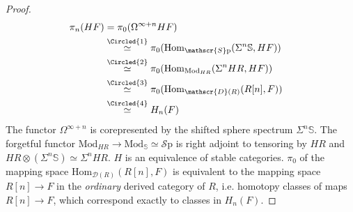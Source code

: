 \documentclass[10pt]{amsart}
\newcommand{\D}{\mathscr{D}}
\newcommand{\bS}{\mathbb{S}}
\newcommand{\Hom}{\mathrm{Hom}}
\newcommand{\Sp}{\mathscr{S}\mathrm{p}}
\newcommand{\Mod}{\mathrm{Mod}}
\theoremstyle{definition}
\theoremstyle{remark}
\numberwithin{equation}{section}
\begin{document}
\begin{proof}
  \begin{align*}
    \pi_n(HF) & =\pi_0(\Omega^{\infty+n}HF)\\
    & \overset{\Circled{1}}{\simeq} \pi_0(\Hom_{\Sp}(\Sigma^n\bS,HF)) \\
    & \overset{\Circled{2}}{\simeq} \pi_0(\Hom_{\Mod_{HR}}(\Sigma^n HR,HF)) & \\
    & \overset{\Circled{3}}{\simeq} \pi_0(\Hom_{\D(R)}(R[n],F))\\
    & \overset{\Circled{4}}{\simeq} H_n(F)
  \end{align*}  The functor $\Omega^{\infty+n}$ is corepresented by the shifted sphere spectrum $\Sigma^n\bS$.  The forgetful functor $\Mod_{HR}\to\Mod_\bS\simeq\Sp$ is right adjoint to tensoring by $HR$ and $HR\otimes(\Sigma^n\bS)\simeq \Sigma^nHR$.  $H$ is an equivalence of stable categories.  $\pi_0$ of the mapping space $\Hom_{\D(R)}(R[n],F)$ is equivalent to the mapping space $R[n]\to F$ in the \emph{ordinary} derived category of $R$, i.e. homotopy classes of maps $R[n]\to F$, which correspond exactly to classes in $H_n(F)$.
\end{proof}
\end{document}
